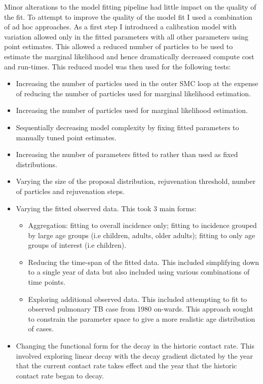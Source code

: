 \documentclass[11pt,twoside]{bristolthesis}
\providecommand{\tightlist}{%
  \setlength{\itemsep}{0pt}\setlength{\parskip}{0pt}}
\begin{document}
  Minor alterations to the model fitting pipeline had little impact on the quality of the fit. To attempt to improve the quality of the model fit I used a combination of ad hoc approaches. As a first step I introduced a calibration model with variation allowed only in the fitted parameters with all other parameters using point estimates. This allowed a reduced number of particles to be used to estimate the marginal likelihood and hence dramatically decreased compute cost and run-times. This reduced model was then used for the following tests:
  \begin{itemize}
  \tightlist
  \item
    Increasing the number of particles used in the outer SMC loop at the expense of reducing the number of particles used for marginal likelihood estimation.
  \item
    Increasing the number of particles used for marginal likelihood estimation.
  \item
    Sequentially decreasing model complexity by fixing fitted parameters to manually tuned point estimates.
  \item
    Increasing the number of parameters fitted to rather than used as fixed distributions.
  \item
    Varying the size of the proposal distribution, rejuvenation threshold, number of particles and rejuvenation steps.
  \item
    Varying the fitted observed data. This took 3 main forms:
    \begin{itemize}
    \tightlist
    \item
      Aggregation: fitting to overall incidence only; fitting to incidence grouped by large age groups (i.e children, adults, older adults); fitting to only age groups of interest (i.e children).
    \item
      Reducing the time-span of the fitted data. This included simplifying down to a single year of data but also included using various combinations of time points.
    \item
      Exploring additional observed data. This included attempting to fit to observed pulmonary TB case from 1980 on-wards. This approach sought to constrain the parameter space to give a more realistic age distribution of cases.
    \end{itemize}
  \item
    Changing the functional form for the decay in the historic contact rate. This involved exploring linear decay with the decay gradient dictated by the year that the current contact rate takes effect and the year that the historic contact rate began to decay.

\end{itemize}
\end{document}
